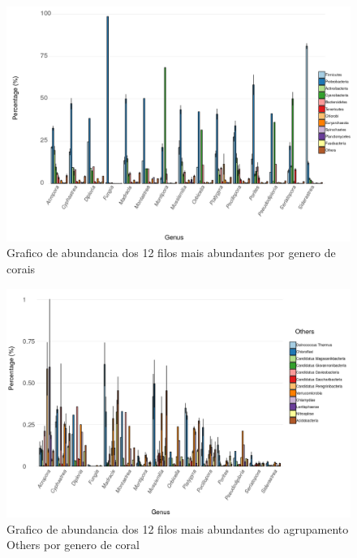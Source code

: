 \documentclass[12pt, a4paper]{report}
\begin{document}

\begin{figure}[H]
	\centering
	\includegraphics[scale=0.4]{figures/barplot_coral_genus_12_most_abundant_1_fevereiro_2019_edited.png}
	\caption{Grafico de abundancia dos 12 filos mais abundantes por genero de corais}
	\label{fig: barplotcoralgenus12mostabundant1fevereiro2019}
\end{figure}

\begin{figure}[H]
	\centering
	\includegraphics[scale=0.4]{figures/barplot_coral_genus_12_others_1_fevereiro_2019_edited.png}
	\caption{Grafico de abundancia dos 12 filos mais abundantes do agrupamento Others por genero de coral}
	\label{fig: barplotcoralgenus12mostabundantofothers1fevereiro2019}
\end{figure}
\end{document}
